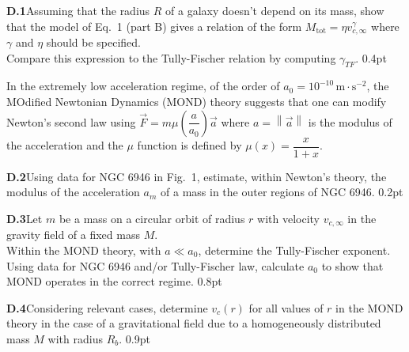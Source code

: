 \textbf{D.1}\quad Assuming that the radius $R$ of a galaxy doesn't depend on its
mass, show that the model of Eq.~1 (part B) gives a relation of the form
$M_\mathrm{tot} = \eta v_{c,\infty}^\gamma$ where $\gamma$ and $\eta$ should be
specified.\\
Compare this expression to the Tully-Fischer relation by computing
$\gamma_{TF}$. \hfill 0.4pt

In the extremely low acceleration regime, of the order of
$a_0 = 10^{-10}\,\mathrm{m\cdot s^{-2}}$, the MOdified Newtonian Dynamics (MOND)
theory suggests that one can modify Newton's second law using
$\overrightarrow{F} = m\mu\left(\dfrac{a}{a_0}\right)\overrightarrow{a}$ where
$a = \left\|\overrightarrow{a}\right\|$ is the modulus of the acceleration and
the $\mu$ function is defined by $\mu(x) = \dfrac{x}{1 + x}$.

\textbf{D.2}\quad Using data for NGC 6946 in Fig.~1, estimate, within Newton's
theory, the modulus of the acceleration $a_m$ of a mass in the outer regions of
NGC 6946. \hfill 0.2pt

\textbf{D.3}\quad Let $m$ be a mass on a circular orbit of radius $r$ with
velocity $v_{c,\infty}$ in the gravity field of a fixed mass $M$.\\
Within the MOND theory, with $a \ll a_0$, determine the Tully-Fischer
exponent.\\
Using data for NGC 6946 and/or Tully-Fischer law, calculate $a_0$ to show that
MOND operates in the correct regime. \hfill 0.8pt

\textbf{D.4}\quad Considering relevant cases, determine $v_c(r)$ for all values
of $r$ in the MOND theory in the case of a gravitational field due to a
homogeneously distributed mass $M$ with radius $R_b$. \hfill 0.9pt
